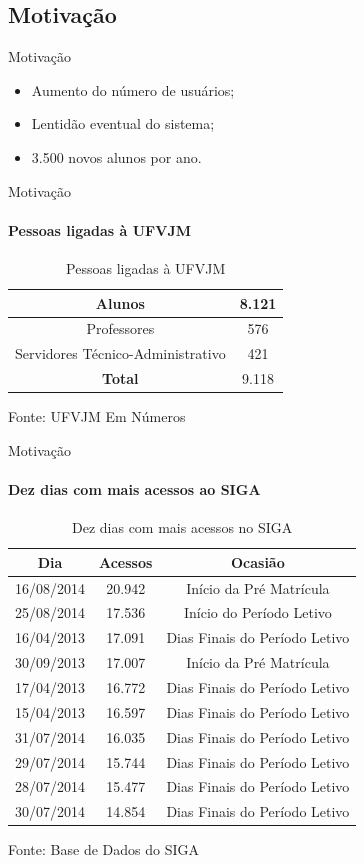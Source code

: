 \subsection*{Motivação}
\begin{frame}{Motivação}
	\begin{itemize}
		\item Aumento do número de usuários; \pause
		\item Lentidão eventual do sistema; \pause
		\item 3.500 novos alunos por ano.
	\end{itemize}
\end{frame}
\begin{frame}{Motivação}
	\framesubtitle{Pessoas ligadas à UFVJM}
	\centering
	\begin{table}
		\caption{Pessoas ligadas à UFVJM}
		\begin{tabular}{|c|c|}
			\hline
			Alunos & 8.121 \\ \hline
			Professores & 576 \\ \hline
			Servidores Técnico-Administrativo & 421 \\ \hline
			\textbf{Total} & 9.118 \\ \hline
		\end{tabular}
	\end{table}
	Fonte: UFVJM Em Números
\end{frame}
\begin{frame}{Motivação}
	\framesubtitle{Dez dias com mais acessos ao SIGA}
	\centering
	{\small \begin{table}
		\caption{Dez dias com mais acessos no SIGA}
		\begin{tabular}{|c|c|c|}
			\hline
			\textbf{Dia} & \textbf{Acessos}  & \textbf{Ocasião} \\ \hline
			16/08/2014 & 20.942 & Início da Pré Matrícula \\ \hline
			25/08/2014 & 17.536 & Início do Período Letivo \\ \hline
			16/04/2013 & 17.091 & Dias Finais do Período Letivo \\ \hline
			30/09/2013 & 17.007 & Início da Pré Matrícula \\ \hline
			17/04/2013 & 16.772 & Dias Finais do Período Letivo \\ \hline
			15/04/2013 & 16.597 & Dias Finais do Período Letivo \\ \hline
			31/07/2014 & 16.035 & Dias Finais do Período Letivo \\ \hline
			29/07/2014 & 15.744 & Dias Finais do Período Letivo \\ \hline
			28/07/2014 & 15.477 & Dias Finais do Período Letivo \\ \hline
			30/07/2014 & 14.854 & Dias Finais do Período Letivo \\ \hline
		\end{tabular}
	\end{table}}
	Fonte: Base de Dados do SIGA
\end{frame}


